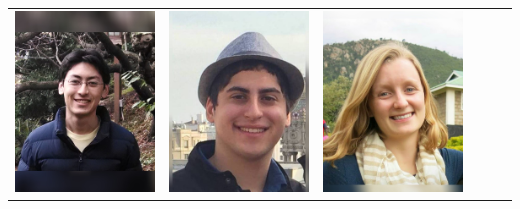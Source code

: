 \documentclass[landscape,a0paper,fontscale=0.292]{baposter}
\begin{document}
\begin{poster}
{\begin{center}
\begin{tabularx}{\linewidth}{X X X X X X}
{\centering \includegraphics[width=0.6\linewidth]{araki.jpg}}&
{\centering \includegraphics[width=0.6\linewidth]{nbuckman.jpg}}&
{\centering \includegraphics[width=0.6\linewidth]{vdean.jpg}}&

\end{tabularx}
\end{center}}
\end{poster}
\end{document}
